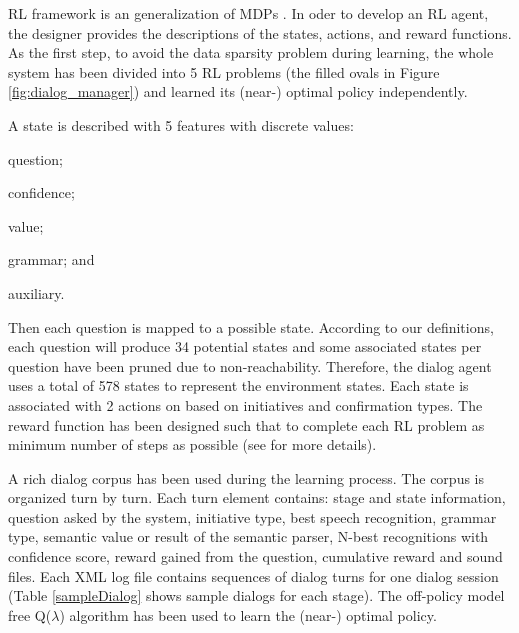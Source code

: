 \documentclass[letterpaper]{article}
\begin{document}
RL framework is an generalization of MDPs \cite{sutton1998reinforcement}. In oder to develop an RL 
agent, the designer provides the descriptions of the states, actions, and reward functions. As the 
first step, to avoid the data sparsity problem during learning, the whole system has been 
divided into 5 RL problems (the filled ovals in Figure \ref{fig:dialog_manager}) and learned its 
(near-) optimal policy independently. 

A state is described with 5 features with discrete values: \begin{inparaenum}[1)] \item question; 
\item confidence; \item value; \item grammar; and \item auxiliary. \end{inparaenum} Then each 
question is mapped to a possible state. According to our definitions, each question will produce 34 
potential states and some associated states per question have been pruned due to non-reachability. 
Therefore, the dialog agent uses a total of 578 states to represent the environment states. Each 
state is associated with 2 actions on based on initiatives and  confirmation types. The reward 
function has been designed such that to complete each RL problem as minimum number of steps as 
possible (see \cite{YASCLL14} for more details).  

A rich dialog corpus has been used during the learning process. The corpus is organized turn by 
turn. Each turn element contains: stage and state information, question asked by the system,  
initiative type,  best speech recognition, grammar type, semantic value or result of the semantic 
parser, N-best recognitions with confidence score, reward gained from the question, cumulative 
reward and sound files. Each XML log file contains sequences of dialog turns for one dialog 
session (Table \ref{sampleDialog} shows  sample dialogs for each stage). The off-policy model free 
Q($\lambda$) algorithm has been used to learn the (near-) optimal policy.
\end{document}
